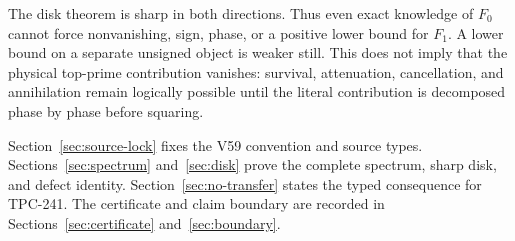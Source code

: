 The disk theorem is sharp in both directions.  Thus even exact knowledge of
$F_0$ cannot force nonvanishing, sign, phase, or a positive lower bound for
$F_1$.  A lower bound on a separate unsigned object is weaker still.  This
does not imply that the physical top-prime contribution vanishes: survival,
attenuation, cancellation, and annihilation remain logically possible until
the literal contribution is decomposed phase by phase before squaring.

Section~\ref{sec:source-lock} fixes the V59 convention and source types.
Sections~\ref{sec:spectrum} and~\ref{sec:disk} prove the complete spectrum,
sharp disk, and defect identity.  Section~\ref{sec:no-transfer} states the
typed consequence for TPC-241.  The certificate and claim boundary are
recorded in Sections~\ref{sec:certificate} and~\ref{sec:boundary}.

